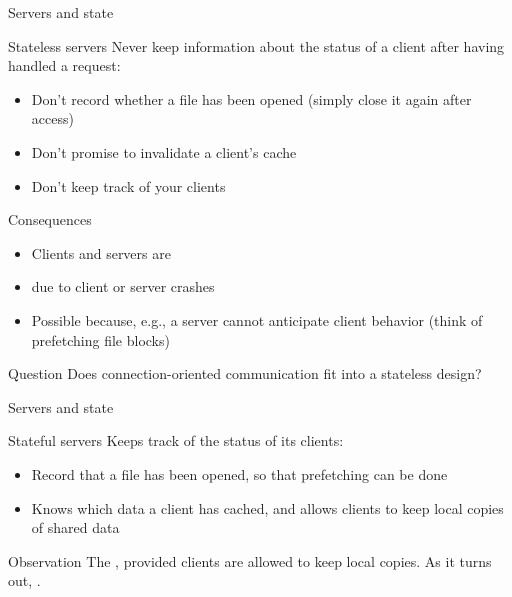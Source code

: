 \begin{slide}{Servers and state}
  \begin{block}{Stateless servers}
    Never keep  information about the status of a client after having handled a request:
    \begin{itemize}\tightlist
    \item Don't record whether a file has been opened (simply close it again after access)
    \item Don't promise to invalidate a client's cache
    \item Don't keep track of your clients
    \end{itemize}
  \end{block}
  \begin{block}{Consequences}
    \begin{itemize}\tightlist
    \item Clients and servers are 
    \item {} due to client or server crashes 
    \item Possible  because, e.g., a server cannot anticipate client behavior (think of
      prefetching file blocks)
    \end{itemize}
  \end{block}
  \begin{alertblock}{Question}
    Does connection-oriented communication fit into a stateless design?
  \end{alertblock}
\end{slide}
\begin{slide}{Servers and state}
  \begin{block}{Stateful servers}
    Keeps track of the status of its clients:
    \begin{itemize}\tightlist
    \item Record that a file has been opened, so that prefetching can be done
    \item Knows which data a client has cached, and allows clients to keep local copies of shared data
    \end{itemize}
  \end{block}
  \begin{alertblock}{Observation} 
    The , provided clients are allowed to keep
    local copies. As it turns out, .
  \end{alertblock}
\end{slide}
